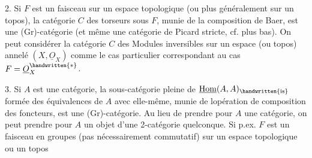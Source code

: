  2. Si $F$ est un faisceau sur un espace topologique (ou plus généralement sur un topos), la catégorie $C$ des torseurs sous $F$, munie de la composition de Baer, est une (Gr)-catégorie (et même une catégorie de Picard stricte, cf. plus bas). On peut considérer la catégorie $C$ des Modules inversibles sur un espace (ou topos)  annelé  $(X,\underline{O}_{X})$ comme le cas particulier correspondant au cas $F=\underline{O}_{X}^{\handwritten{*}}$.

 3. Si $A$ est une catégorie, la sous-catégorie pleine  de $\underline{\mathrm{Hom}}(A,A)_{\handwritten{\mathrm{is}}}$ formée des équivalences de $A$ avec elle-même, munie de lopération de composition des foncteurs, est une (Gr)-catégorie. Au lieu de prendre pour $A$ une catégorie, on peut  prendre pour $A$ un objet d'une 2-catégorie quelconque. Si p.ex. $F$ est un faisceau en groupes (pas nécessairement commutatif) sur un espace topologique \handwritten{(}ou un topos\handwritten{)}\handwritten{,}
